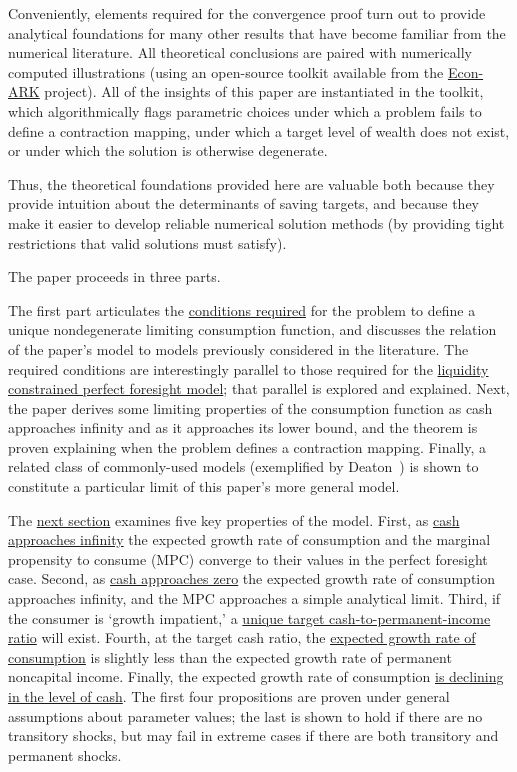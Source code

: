 \documentclass[BufferStockTheory]{subfiles}
\begin{document}
Conveniently, elements required for the convergence proof turn out to provide analytical foundations for many other results that have become familiar from the numerical literature.  All theoretical conclusions are paired with numerically computed illustrations (using an open-source toolkit available from the \href{https://github.com/econ-ark/REMARK/blob/master/REMARKs/BufferStockTheory/BufferStockTheory.ipynb}{Econ-ARK} project).  All of the insights of this paper are instantiated in the toolkit, which algorithmically flags parametric choices under which a problem fails to define a contraction mapping, under which a target level of wealth does not exist, or under which the solution is otherwise degenerate.

Thus, the theoretical foundations provided here are valuable both because they provide intuition about the determinants of saving targets, and because they make it easier to develop reliable numerical solution methods (by providing tight restrictions that valid solutions must satisfy).

The paper proceeds in three parts.

The first part articulates the \hyperlink{Sufficient-Conditions}{conditions required} for the problem to define a unique nondegenerate limiting consumption function, and discusses the relation of the paper's model to models previously considered in the literature.  The required conditions are interestingly parallel to those required for the \hyperlink{Factors-Defined-And-Compared}{liquidity constrained perfect foresight model}; that parallel is explored and explained.  Next, the paper derives some limiting properties of the consumption function as cash approaches infinity and as it approaches its lower bound, and the theorem is proven explaining when the problem defines a contraction mapping.  Finally, a related class of commonly-used models (exemplified by Deaton~\citeyearpar{deatonLiqConstr}) is shown to constitute a particular limit of this paper's more general model.

The \hyperlink{AnalysisoftheConvergedConsumptionFunction}{next section} examines five key properties of the model. First, as \hyperlink{LimitsAsmtToInfty}{cash approaches infinity} the expected growth rate of consumption and the marginal propensity to consume (MPC) converge to their values in the perfect foresight case. Second, as \hyperlink{LimitsAsmtToZero}{cash approaches zero} the expected growth rate of consumption approaches infinity, and the MPC approaches a simple analytical limit.  Third, if the consumer is `growth impatient,' a \hyperlink{onetarget}{unique target cash-to-permanent-income ratio} will exist.  Fourth, at the target cash ratio, the \hyperlink{cGroLTpGro}{expected growth rate of consumption} is slightly less than the expected growth rate of permanent noncapital income.  Finally, the expected growth rate of consumption \hyperlink{dcgdxneg}{is declining in the level of cash}. The first four propositions are proven under general assumptions about parameter values; the last is shown to hold if there are no transitory shocks, but may fail in extreme cases if there are both transitory and permanent shocks.
\end{document}
